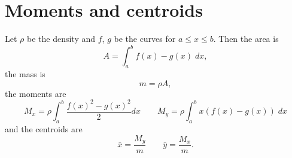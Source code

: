 \section{Moments and centroids}
Let $\rho$ be the density and $f$, $g$ be the curves for $a\leq x\leq
b$. Then the area is
\begin{equation}
  \label{eq:under-curve}
A=\int_a^b f(x)-g(x)\;dx,
\end{equation}
the mass is
\begin{equation}
  \label{eq:mass}
m=\rho A,
\end{equation}
the moments are
\begin{equation}
  \label{eq:moments}
M_x=\rho\int_a^b\frac{f(x)^2-g(x)^2}{2}dx
\qquad
M_y=\rho\int_a^bx(f(x)-g(x))\;dx
\end{equation}
and the centroids are
\begin{equation}
\label{eq:centroids}
\bar x=\frac{M_y}{m}
\qquad
\bar y=\frac{M_x}{m}.
\end{equation}

